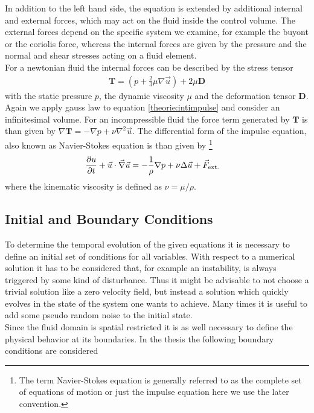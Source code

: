 In addition to the left hand side, the equation is extended by additional internal and external forces, which may act on the fluid inside the control volume.
The external forces depend on the specific system  we examine, for example the buyont or the coriolis force, whereas the internal forces
are given by the pressure and the normal and shear stresses acting on a fluid element.\\
For a newtonian fluid the internal forces can be described by the stress tensor
\begin{align}
    \bm{T} =  \left(p + \frac{2}{3}\mu\nabla\vec{u} \right) + 2\mu \bm{D}
\end{align}
with the static pressure $p$, the dynamic viscosity $\mu$ and the deformation tensor $\bm{D}$.
Again we apply gauss law to equation \ref{theorie:intimpulse} and consider an infinitesimal volume.
For an incompressible fluid the force term generated by $\bm{T}$ is than given by $\nabla \bm{T} = -\nabla p  + \nu\nabla^2\vec{u}$.
The differential form of the impulse equation, also known as Navier-Stokes equation
is than given by
\footnote{The term Navier-Stokes equation is generally referred to as the complete set of equations of motion or
just the impulse equation here we use the later convention.}
\begin{align}
    \label{theorie:eqns}
    \pdn[u]{t} + \vec{u} \cdot \vec{\nabla} \vec{u} &= - \frac{1}{\rho} \nabla p + \nu \Delta \vec{u} + \vec{F}_{\text{ext.}}
\end{align}
where the kinematic viscosity is defined as $\nu = \mu/\rho$.


\subsection{Initial and Boundary Conditions}

To determine the temporal evolution of the given equations it is necessary to define an initial set of conditions for all variables.
With respect to a numerical solution it has to be considered that, for example an instability, is always triggered by some kind of disturbance.
Thus it might be advisable to not choose a trivial solution like a zero velocity field, but instead a solution which quickly evolves in the state
of the system one wants to achieve. Many times it is useful to add some pseudo random noise to the initial state.\\
Since the fluid domain is spatial restricted it is as well necessary to define the physical behavior at its boundaries.
In the thesis the following boundary conditions are considered


